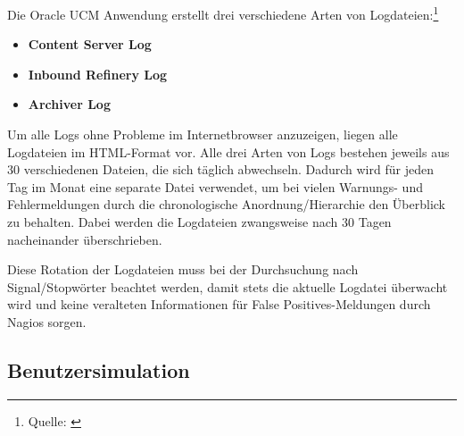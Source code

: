 Die Oracle UCM Anwendung erstellt drei verschiedene Arten von Logdateien:\footnote{Quelle: \cite{UCMlog09}}

\begin{itemize}
\item \textbf{Content Server Log} 
\item \textbf{Inbound Refinery Log}
\item \textbf{Archiver Log}
\end{itemize}

Um alle Logs ohne Probleme im Internetbrowser anzuzeigen, liegen alle Logdateien im HTML-Format vor.
Alle drei Arten von Logs bestehen jeweils aus 30 verschiedenen Dateien, die sich täglich abwechseln.
Dadurch wird für jeden Tag im Monat eine separate Datei verwendet, um bei vielen Warnungs- und Fehlermeldungen durch die chronologische Anordnung/Hierarchie den Überblick zu behalten.
Dabei werden die Logdateien zwangsweise nach 30 Tagen nacheinander überschrieben.

Diese Rotation der Logdateien muss bei der Durchsuchung nach Signal/Stopwörter beachtet werden, damit stets die aktuelle Logdatei überwacht wird und keine veralteten Informationen für False Positives-Meldungen durch Nagios sorgen.


\subsection{Benutzersimulation}

